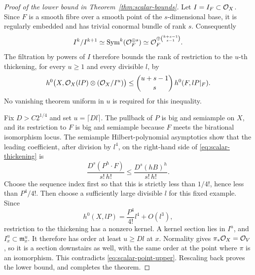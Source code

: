 \begin{proof}[Proof of the lower bound in Theorem~\ref{thm:scalar-bounds}]
Let $I=I_F\subset\mathcal O_X$.  Since $F$ is a smooth fibre over a smooth
point of the $s$-dimensional base, it is regularly embedded and has
trivial conormal bundle of rank $s$.  Consequently
\[
 I^k/I^{k+1}\simeq
 \operatorname{Sym}^k(\mathcal O_F^{\oplus s})
 \simeq\mathcal O_F^{\oplus\binom{k+s-1}{s-1}}.
\]
The filtration by powers of $I$ therefore bounds the rank of
restriction to the $u$-th thickening, for every $u\ge1$ and every
divisible $l$, by
\begin{equation}\label{eq:scalar-thickening}
 h^0\bigl(X,\mathcal O_X(lP)\otimes(\mathcal O_X/I^u)\bigr)
 \le\binom{u+s-1}{s}\,h^0(F,lP|_F).
\end{equation}
No vanishing theorem uniform in $u$ is required for this inequality.

Fix $D>C2^{1/4}$ and set $u=\lceil Dl\rceil$.  The pullback of $P$
is big and semiample on $X$, and its restriction to $F$ is big and
semiample because $F$ meets the birational isomorphism locus.
The semiample Hilbert-polynomial asymptotics show that the leading
coefficient, after division by $l^4$, on the right-hand side of
\eqref{eq:scalar-thickening} is
\[
 \frac{D^s(P^h\cdot F)}{s!\,h!}
 \le\frac{D^s(hB)^h}{s!\,h!}.
\]
Choose the sequence index first so that this is strictly less than
$1/4!$, hence less than $P^4/4!$.  Then choose a sufficiently large
divisible $l$ for this fixed example.  Since
\[
 h^0(X,lP)=\frac{P^4}{4!}l^4+O(l^3),
\]
restriction to the thickening has a nonzero kernel.  A kernel section
lies in $I^u$, and $I_x^u\subset\mathfrak m_x^u$.  It therefore has
order at least $u\ge Dl$ at $x$.  Normality gives
$\pi_*\mathcal O_X=\mathcal O_V$, so it is a section downstairs as well, with
the same order at the point where $\pi$ is an isomorphism.  This
contradicts \eqref{eq:scalar-point-upper}.  Rescaling back proves the
lower bound, and completes the theorem.
\end{proof}
